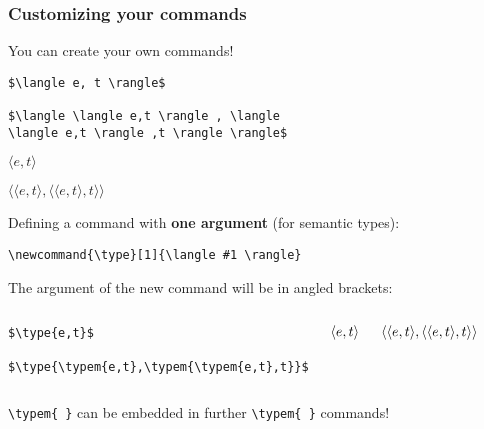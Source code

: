 \begin{frame}[fragile]
\frametitle{Customizing your commands}

You can create your own commands!

\begin{multicols}{2}
\begin{lstlisting}
$\langle e, t \rangle$

$\langle \langle e,t \rangle , \langle 
\langle e,t \rangle ,t \rangle \rangle$
\end{lstlisting}

\columnbreak 

$\langle e, t \rangle$

\smallskip

$\langle \langle e,t \rangle , \langle \langle e,t \rangle ,t \rangle \rangle$

\end{multicols}

\pause

%
%

Defining a command with \textbf{one argument} (for semantic types):

{\small
\begin{lstlisting}
\newcommand{\type}[1]{\langle #1 \rangle}
\end{lstlisting}
}

\smallskip

The argument of the new command will be in angled brackets:

\vspace{-.25cm}

\begin{columns}
	

{\small
\begin{lstlisting}
$\type{e,t}$

$\type{\typem{e,t},\typem{\typem{e,t},t}}$
\end{lstlisting}
}



$\langle e,t \rangle$

\smallskip

$\langle \langle e,t \rangle,\langle \langle e,t \rangle,t \rangle \rangle$

\end{columns}


\bigskip


\lstinline|\typem{ }| can be embedded in further \lstinline|\typem{ }| commands!

\end{frame}


